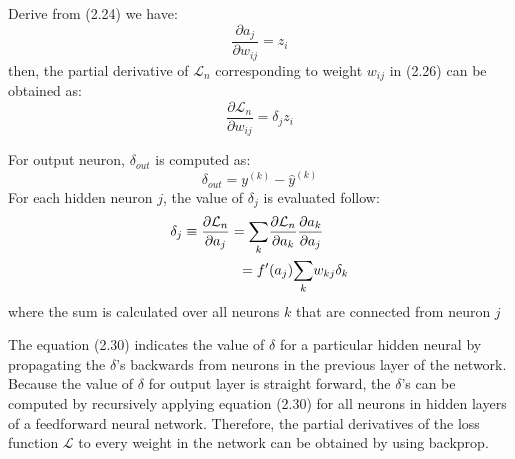Derive from (2.24) we have:
\begin{equation}
    \frac{\partial a_j}{ \partial w_{ij}} = z_i
\end{equation}
then, the partial derivative of $\mathcal{L}_n$ corresponding to weight $w_{ij}$ in (2.26) can be obtained as:
\begin{equation}
    \frac{\partial \mathcal{L}_n}{ \partial w_{ij}} = \delta_j z_i
\end{equation}
\par For output neuron, $\delta_{out}$ is computed as:
\begin{equation}
    \delta_{out} = y^{(k)} - \hat{y}^{(k)}
\end{equation}
For each hidden neuron $j$, the value of $\delta_j$ is evaluated follow:
\begin{equation}
    \begin{split}
        \delta_j & \equiv \frac{\partial \mathcal{L}_n}{ \partial a_{j}} = \underset{k}{\sum}\frac{\partial \mathcal{L}_n}{ \partial a_{k}}\frac{\partial a_k}{ \partial a_{j}}\\
                        &\hspace{1.4cm} = f'(a_j)\underset{k}{\sum}w_{kj}\delta_k
    \end{split}
\end{equation}
where the sum is calculated over all neurons $k$ that are connected from neuron $j$\par
The equation (2.30) indicates the value of $\delta$ for a particular hidden neural by propagating the $\delta$'s backwards from neurons in the previous layer of the network. Because the value of $\delta$ for output layer is straight forward, the $\delta$'s can be computed by recursively applying equation (2.30) for all neurons in hidden layers of a feedforward neural network. Therefore, the partial derivatives of the loss function $\mathcal{L}$ to every weight in the network can be obtained by using backprop.
